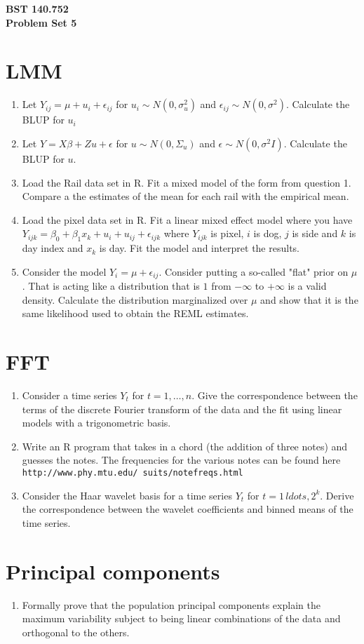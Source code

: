 \documentclass[12pt]{article}
\begin{document}
\noindent
{\bf BST 140.752 \\ Problem Set 5} \\
\section{LMM}
\begin{enumerate}
\item Let $Y_{ij} = \mu + u_i + \epsilon_{ij}$ for $u_i \sim N(0,\sigma^2_u)$ and $\epsilon_{ij} \sim N(0, \sigma^2)$. Calculate the BLUP 
for $u_i$
\item Let $Y = X \beta + Z u + \epsilon$ for $u \sim N(0,\Sigma_u)$ and $\epsilon \sim N(0, \sigma^2 I)$. Calculate the BLUP for $u$. 
\item Load the Rail data set in R. Fit a mixed model of the form from question 1. Compare a the estimates of the mean for each rail with the empirical mean.	
\item Load the pixel data set in R. Fit a linear mixed effect model where you have $Y_{ijk} = \beta_0 + \beta_1 x_{k} + u_{i} + u_{ij} + \epsilon_{ijk}$
where $Y_{ijk}$ is pixel, $i$ is dog, $j$ is side and $k$ is day index and $x_k$ is day. Fit the model and interpret the results.
\item Consider the model $Y_{i} = \mu + \epsilon_{ij}$. Consider putting a so-called "flat" prior on $\mu$. That is acting like a distribution
that is $1$ from $-\infty$ to $+\infty$ is a valid density. Calculate the distribution marginalized over $\mu$ and show that it is the same likelihood
used to obtain the REML estimates.
\end{enumerate}

\section{FFT}
\begin{enumerate}
\item Consider a time series $Y_t$ for $t=1,\ldots,n$. Give the correspondence between the terms of the discrete Fourier transform of the data and the
fit using linear models with a trigonometric basis.
\item Write an R program that takes in a chord (the addition of three notes) and guesses the notes. The frequencies for the various notes can be found here
\texttt{http://www.phy.mtu.edu/~suits/notefreqs.html}
\item Consider the Haar wavelet basis for a time series $Y_t$ for $t=1\,ldots, 2^k$. Derive the correspondence
between the wavelet coefficients and binned means of the time series.
\end{enumerate}

\section{Principal components}
\begin{enumerate}
\item Formally prove that the population principal components explain the maximum variability subject to being linear combinations of the data
and orthogonal to the others.
\end{enumerate}
\end{document}
